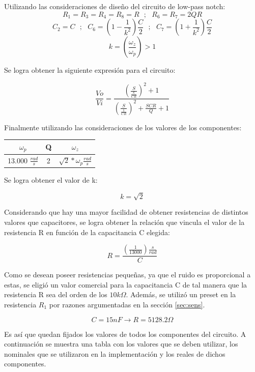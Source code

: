Utilizando las consideraciones de diseño del circuito de low-pass notch:
$$R_1=R_3=R_4=R_8=R \ \ \ ; \ \ \ R_6=R_7=2QR$$
$$C_2=C \ \ \ ; \ \ \ C_6=(1-\frac{1}{k^2})\frac{C}{2}  \ \ \ ; \ \ \ C_7=(1+\frac{1}{k^2})\frac{C}{2}$$
$$k=\left(\frac{\omega_z}{\omega_p} \right) > 1$$

Se logra obtener la siguiente expresión para el circuito:

\begin{equation}
\frac{Vo}{Vi} = \frac{\left(\frac{S}{\frac{k}{C R}}\right)^2 + 1}{\left( \frac{S}{\frac{1}{CR}} \right)^2+\frac{SCR}{Q} + 1}
\label{circ_trans_simple}
\end{equation}

Finalmente utilizando las consideraciones de los valores de los componentes:
\begin{table}[H]
\centering
\begin{tabular}{@{}ccc@{}}
\toprule
$\omega_p$ & Q & $\omega_z$ \\ \midrule
13.000 $\frac{rad}{s}$ & 2 & $\sqrt{2}*\omega_p \frac{rad}{s}$ \\ \bottomrule
\end{tabular}
\end{table}
Se logra obtener el valor de k:

\begin{equation}
k = \sqrt{2}
\end{equation}

Considerando que hay una mayor facilidad de obtener resistencias de distintos valores que capacitores, se logra obtener la relación que vincula el valor de la resistencia R en función de la capacitancia C elegida:

\begin{equation}
R = \frac{\left(\frac{1}{13000}\right) \frac{s}{rad}}{C}
\end{equation}

Como se desean poseer resistencias pequeñas, ya que el ruido es proporcional a estas, se eligió un valor comercial para la capacitancia C de tal manera que la resistencia R sea del orden de los $10k\Omega$. Además, se utilizó un preset en la resistencia $R_1$ por razones argumentadas en la sección \ref{sec:sens}.

$$C=15nF \rightarrow R=5128.2\Omega$$

Es así que quedan fijados los valores de todos los componentes del circuito. A continuación se muestra una tabla con los valores que se deben utilizar, los nominales que se utilizaron en la implementación y los reales de dichos componentes.

